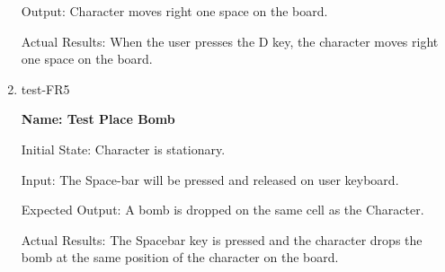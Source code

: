 \documentclass[12pt, titlepage]{article}
\begin{document}
\begin{enumerate}
Output: Character moves right one space on the board.

Actual Results: When the user presses the D key, the character moves right one space on the board.

\item{test-FR5\\}

\textbf{Name: Test Place Bomb}

Initial State: Character is stationary.
					
Input: The Space-bar will be pressed and released on user keyboard.
					
Expected Output: A bomb is dropped on the same cell as the Character.

Actual Results: The Spacebar key is pressed and the character drops the bomb at the same position of the character on the board. 
					

\end{enumerate}
\end{document}
